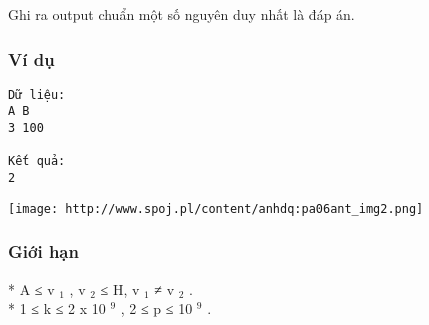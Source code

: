    Ghi ra output chuẩn một số nguyên duy nhất là đáp án.  

\subsubsection{   Ví dụ  }
\begin{verbatim}
Dữ liệu:
A B
3 100

Kết quả:
2
\end{verbatim}


\texttt{[image: http://www.spoj.pl/content/anhdq:pa06ant\_img2.png]}



\subsubsection{   Giới hạn  }

   * A ≤ v   $_    1   $   , v   $_    2   $   ≤ H, v   $_    1   $   ≠ v   $_    2   $   .   
\\   * 1 ≤ k ≤ 2 x 10   $^    9   $   , 2 ≤ p ≤ 10   $^    9   $   .   
\\